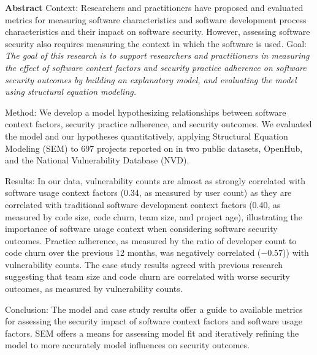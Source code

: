 \label{sec:abstract}
\textbf{Abstract} 
Context: Researchers and practitioners have proposed and evaluated metrics for measuring software characteristics and software development process characteristics and their impact on software security. However, assessing software security also requires measuring the context in which the software is used. 
Goal:  \textit{The goal of this research is to support researchers and practitioners in measuring the effect of software context factors and security practice adherence on software security outcomes by building an explanatory model, and evaluating the model using structural equation modeling.} 

Method: We develop a model hypothesizing relationships between software context factors, security practice adherence, and security outcomes.  We evaluated the model and our hypotheses quantitatively, applying Structural Equation Modeling (SEM) to 697 projects reported on in two public datasets,  OpenHub, and the National Vulnerability Database (NVD).

Results: In our data, vulnerability counts are almost as strongly correlated with software usage context factors (0.34, as measured by user count) as they are correlated with traditional software development context factors (0.40, as measured by code size, code churn, team size, and project age), illustrating the importance of software usage context when considering software security outcomes. Practice adherence, as measured by the ratio of developer count to code churn over the previous 12 months, was negatively correlated ($-0.57$)) with vulnerability counts. The case study results agreed with previous research suggesting that team size and code churn are correlated with worse security outcomes, as measured by vulnerability counts. 

Conclusion: The model and case study results offer a guide to available metrics for assessing the security impact of software context factors and software usage factors. SEM offers a means for assessing model fit and iteratively refining the model to more accurately model influences on security outcomes.